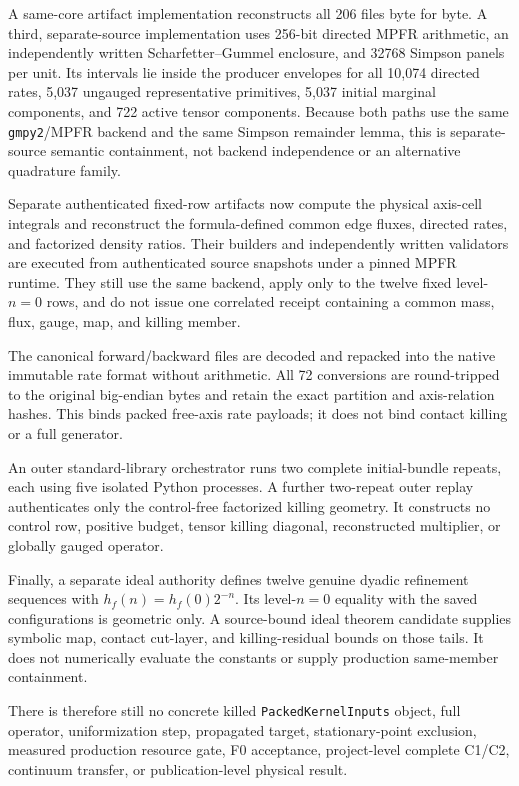 \documentclass[aps,physrev,onecolumn,amsmath,amssymb,longbibliography]{revtex4-2}
\begin{document}
A same-core artifact implementation reconstructs all 206 files byte for byte.
A third, separate-source implementation uses 256-bit directed MPFR arithmetic,
an independently written Scharfetter--Gummel enclosure, and 32768 Simpson
panels per unit.  Its intervals lie inside the producer envelopes for all
10,074 directed rates, 5,037 ungauged representative primitives, 5,037 initial
marginal components, and 722 active tensor components.  Because both paths use
the same \texttt{gmpy2}/MPFR backend and the same Simpson remainder lemma, this
is separate-source semantic containment, not backend independence or an
alternative quadrature family.

Separate authenticated fixed-row artifacts now compute the physical
axis-cell integrals and reconstruct the formula-defined common edge fluxes,
directed rates, and factorized density ratios.  Their builders and independently
written validators are executed from authenticated source snapshots under a
pinned MPFR runtime.  They still use the same backend, apply only to the twelve
fixed level-\(n=0\) rows, and do not issue one correlated receipt containing a
common mass, flux, gauge, map, and killing member.

The canonical forward/backward files are decoded and repacked into the native
immutable rate format without arithmetic.  All 72 conversions are
round-tripped to the original big-endian bytes and retain the exact partition
and axis-relation hashes.  This binds packed free-axis rate payloads; it does
not bind contact killing or a full generator.

An outer standard-library orchestrator runs two complete initial-bundle
repeats, each using five isolated Python processes.  A further two-repeat
outer replay authenticates only the control-free factorized killing geometry.
It constructs no control row, positive budget, tensor killing diagonal,
reconstructed multiplier, or globally gauged operator.

Finally, a separate ideal authority defines twelve genuine dyadic refinement
sequences with \(h_f(n)=h_f(0)2^{-n}\).  Its level-\(n=0\) equality with the
saved configurations is geometric only.  A source-bound ideal theorem
candidate supplies symbolic map, contact cut-layer, and killing-residual
bounds on those tails.  It does not numerically evaluate the constants or
supply production same-member containment.

There is therefore still no concrete killed
\texttt{PackedKernelInputs} object, full operator, uniformization step,
propagated target, stationary-point exclusion, measured production resource
gate, F0 acceptance, project-level complete C1/C2, continuum transfer, or
publication-level physical result.
\end{document}
